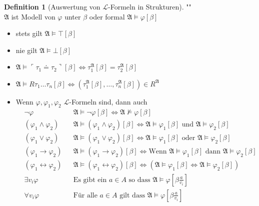 \documentclass[12pt,parskip=full]{scrartcl}
\newcommand{\corners}[1]{{\ulcorner #1 \urcorner }}
\theoremstyle{definition}
\newtheorem{definition}[theorem]{Definition}
\begin{document}
	\begin{definition}[Auswertung von $\mathcal{L}$-Formeln in Strukturen]""\\
		$\mathfrak{A}$ ist Modell von $\varphi$ unter $\beta$ oder formal $\mathfrak{A} \models \varphi[\beta]$
		\begin{itemize}
			\item stets gilt $\mathfrak{A} \models \top[\beta]$
			\item nie gilt $\mathfrak{A} \models \bot[\beta]$
			\item $\mathfrak{A} \models \corners{\tau_1 \doteq \tau_2}[\beta] \Leftrightarrow \tau_1^\mathfrak{A}[\beta] = \tau_2^\mathfrak{A}[\beta]$
			\item $\mathfrak{A} \models R \tau_1 \dots \tau_n [\beta] \Leftrightarrow (\tau_1^\mathfrak{A}[\beta], \dots, \tau_n^\mathfrak{A}[\beta]) \in R^\mathfrak{A}$
			\item Wenn $\varphi, \varphi_1, \varphi_2$ $\mathcal{L}$-Formeln sind, dann auch
			\begin{align*}
				&\lnot \varphi && \mathfrak{A} \models \lnot \varphi[\beta] \Leftrightarrow \mathfrak{A} \not\models \varphi[\beta] \\
				&(\varphi_1 \land \varphi_2) && \mathfrak{A} \models (\varphi_1 \land \varphi_2) [\beta] \Leftrightarrow \mathfrak{A} \models \varphi_1[\beta] \text{ und } \mathfrak{A} \models \varphi_2[\beta] \\
				&(\varphi_1 \lor \varphi_2) && \mathfrak{A} \models (\varphi_1 \lor \varphi_2) [\beta] \Leftrightarrow \mathfrak{A} \models \varphi_1[\beta] \text{ oder } \mathfrak{A} \models \varphi_2[\beta] \\
				&(\varphi_1 \rightarrow \varphi_2)  && \mathfrak{A} \models (\varphi_1 \rightarrow \varphi_2) [\beta] \Leftrightarrow \text{Wenn } \mathfrak{A} \models \varphi_1[\beta] \text{ dann } \mathfrak{A} \models \varphi_2[\beta] \\
				&(\varphi_1 \leftrightarrow \varphi_2)  && \mathfrak{A} \models (\varphi_1 \leftrightarrow \varphi_2) [\beta] \Leftrightarrow (\mathfrak{A} \models \varphi_1[\beta] \Leftrightarrow \mathfrak{A} \models \varphi_2[\beta]) \\
				&\exists v_i \varphi && \text{Es gibt ein $a \in A$ so dass $\mathfrak{A} \models \varphi\left[\beta \frac{a}{v_i}\right]$}\\
				&\forall v_i \varphi && \text{Für alle $a \in A$ gilt dass $\mathfrak{A} \models \varphi\left[\beta \frac{a}{v_i}\right]$}
			\end{align*}
		\end{itemize}
	\end{definition}
	
\end{document}

